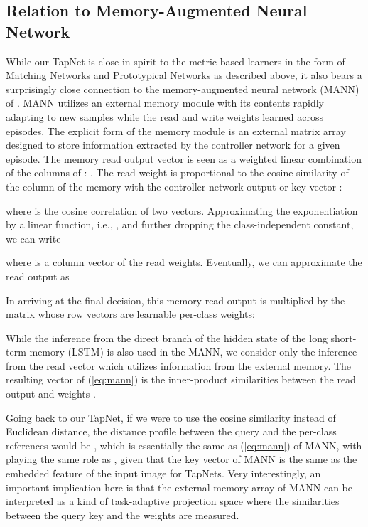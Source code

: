 \documentclass{article}
\begin{document}
\subsection{Relation to Memory-Augmented Neural Network}

While our TapNet is close in spirit to the metric-based learners in the form of Matching Networks and Prototypical Networks as described above, it also bears a surprisingly close connection to the memory-augmented neural network (MANN) of \cite{MANN}. MANN 
utilizes an external memory module with its contents rapidly adapting to new samples while the read and write weights learned across episodes. 
The explicit form of the memory module is an external matrix array  designed to store information extracted by the controller network for a given episode. The memory read output vector  is seen as a weighted linear combination of the columns of : 
. The read weight is proportional to the cosine similarity of the column  of the memory with the controller network output or key vector :  

where  is the cosine correlation of two vectors. Approximating the exponentiation by a linear function, i.e., , and further dropping the class-independent constant,  
we can write 

where  is a column vector of the read weights. 
Eventually, we can approximate the read output  as

In arriving at the final decision, this memory read output is multiplied by the matrix  whose row vectors are learnable per-class weights:

While the inference from the direct branch of the hidden state of the long short-term memory (LSTM) is also used in the MANN, we consider only the inference from the read vector  which utilizes information from the external memory.
The resulting vector of (\ref{eq:mann}) is the inner-product similarities between the read output  and weights . 

Going back to our TapNet, if we were to use the cosine similarity instead of Euclidean distance, the distance profile between the query and the per-class references would be  
 , which is essentially the same as (\ref{eq:mann}) of MANN, with 
   playing the same role as , given that the key vector  of MANN is the same as the embedded feature of the input image for TapNets. Very interestingly, an important implication here is that the external memory array  of MANN can be interpreted as a kind of task-adaptive projection space where the similarities between the query key  and the weights  are measured. 
  
\end{document}
